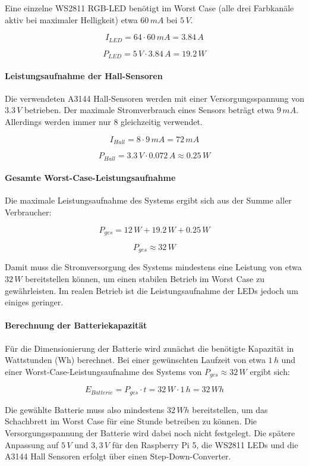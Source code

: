 Eine einzelne WS2811 RGB-LED benötigt im Worst Case (alle drei Farbkanäle aktiv bei maximaler Helligkeit) etwa $60\,mA$ bei $5\,V$. \cite{eevblog_ws2812b_power}

\[
I_{LED} = 64 \cdot 60\,mA = 3.84\,A
\]

\[
P_{LED} = 5\,V \cdot 3.84\,A = 19.2\,W
\]

\paragraph{Leistungsaufnahme der Hall-Sensoren}

Die verwendeten A3144 Hall-Sensoren werden mit einer Versorgungsspannung von $3.3\,V$ betrieben. Der maximale Stromverbrauch eines Sensors beträgt etwa $9\,mA$. Allerdings werden immer nur 8 gleichzeitig verwendet.

\[
I_{Hall} = 8 \cdot 9\,mA = 72\,mA
\]

\[
P_{Hall} = 3.3\,V \cdot 0.072\,A \approx 0.25\,W
\]

\paragraph{Gesamte Worst-Case-Leistungsaufnahme}

Die maximale Leistungsaufnahme des Systems ergibt sich aus der Summe aller Verbraucher:

\[
P_{ges} = 12\,W + 19.2\,W + 0.25\,W
\]

\[
P_{ges} \approx 32\,W
\]

Damit muss die Stromversorgung des Systems mindestens eine Leistung von etwa $32\,W$ bereitstellen können, um einen stabilen Betrieb im Worst Case zu gewährleisten. Im realen Betrieb ist die Leistungsaufnahme der LEDs jedoch um einiges geringer.

\paragraph{Berechnung der Batteriekapazität}

Für die Dimensionierung der Batterie wird zunächst die benötigte Kapazität in Wattstunden (Wh) berechnet. Bei einer gewünschten Laufzeit von etwa $1\,h$ und einer Worst-Case-Leistungsaufnahme des Systems von $P_{ges} \approx 32\,W$ ergibt sich:

\[
E_{Batterie} = P_{ges} \cdot t = 32\,W \cdot 1\,h = 32\,Wh
\]

Die gewählte Batterie muss also mindestens $32\,Wh$ bereitstellen, um das Schachbrett im Worst Case für eine Stunde betreiben zu können. Die Versorgungsspannung der Batterie wird dabei noch nicht festgelegt. Die spätere Anpassung auf $5\,V$ und $3,3\,V$ für den Raspberry Pi 5, die WS2811 LEDs und die A3144 Hall Sensoren erfolgt über einen Step-Down-Converter. 

